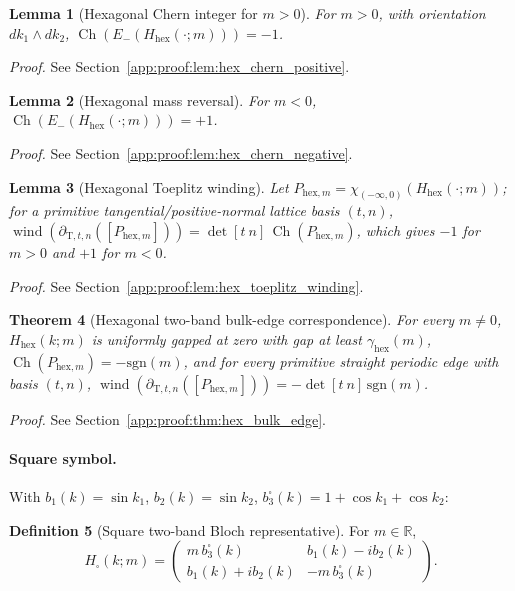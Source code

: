 \documentclass[11pt]{article}
\numberwithin{equation}{section}
\newtheorem{theorem}{Theorem}[section]
\newtheorem{lemma}[theorem]{Lemma}
\theoremstyle{definition}
\newtheorem{definition}[theorem]{Definition}
\theoremstyle{remark}
\newcommand{\proofref}[1]{%
  \par\noindent\emph{Proof.} See Section~\ref{#1}.\par\medskip
}
\newcommand{\proofappendixref}[1]{\proofref{#1}}
\newcommand{\sgn}{\mathrm{sgn}}
\newcommand{\Ch}{\operatorname{Ch}}
\newcommand{\hexagon}{\mathrm{hex}}
\begin{document}
\begin{lemma}[Hexagonal Chern integer for \(m>0\)]\label{lem:hex_chern_positive}
For \(m>0\), with orientation \(dk_1\wedge dk_2\),
\(\Ch(E_-(H_{\hexagon}(\cdot;m)))=-1\).
\end{lemma}
\proofappendixref{app:proof:lem:hex_chern_positive}

\begin{lemma}[Hexagonal mass reversal]\label{lem:hex_chern_negative}
For \(m<0\), \(\Ch(E_-(H_{\hexagon}(\cdot;m)))=+1\).
\end{lemma}
\proofappendixref{app:proof:lem:hex_chern_negative}

\begin{lemma}[Hexagonal Toeplitz winding]\label{lem:hex_toeplitz_winding}
Let \(P_{\hexagon,m}=\chi_{(-\infty,0)}(H_{\hexagon}(\cdot;m))\); for a primitive
tangential/positive-normal lattice basis \((t,n)\),
\(\operatorname{wind}(\partial_{\mathrm T,t,n}([P_{\hexagon,m}]))=\det[t\ n]\,\Ch(P_{\hexagon,m})\),
which gives \(-1\) for \(m>0\) and \(+1\) for \(m<0\).
\end{lemma}
\proofappendixref{app:proof:lem:hex_toeplitz_winding}

\begin{theorem}[Hexagonal two-band bulk-edge correspondence]\label{thm:hex_bulk_edge}
For every \(m\ne0\), \(H_{\hexagon}(k;m)\) is uniformly gapped at zero with gap at least
\(\gamma_{\hexagon}(m)\), \(\Ch(P_{\hexagon,m})=-\sgn(m)\), and for every primitive straight
periodic edge with basis \((t,n)\),
\(\operatorname{wind}(\partial_{\mathrm T,t,n}([P_{\hexagon,m}]))=-\det[t\ n]\,\sgn(m)\).
\end{theorem}
\proofappendixref{app:proof:thm:hex_bulk_edge}

\paragraph{Square symbol.}
With \(b_1(k)=\sin k_1\), \(b_2(k)=\sin k_2\), \(b_3^{\square}(k)=1+\cos k_1+\cos k_2\):

\begin{definition}[Square two-band Bloch representative]\label{def:square_bloch_symbol}
For \(m\in\mathbb R\),
\[H_{\square}(k;m)=
\begin{pmatrix} m\,b_3^{\square}(k) & b_1(k)-i b_2(k)\\ b_1(k)+i b_2(k) & -m\,b_3^{\square}(k)\end{pmatrix}.\]
\end{definition}
\end{document}

